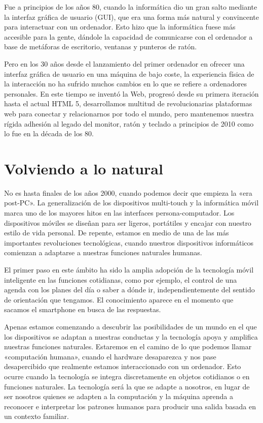 Fue a principios de los años 80, cuando la informática dio un gran salto mediante la interfaz gráfica de usuario (GUI), que era una forma más natural y convincente para interactuar con un ordenador. Esto hizo que la informática fuese más accesible para la gente, dándole la capacidad de comunicarse con el ordenador a base de metáforas de escritorio, ventanas y punteros de ratón.

Pero en los 30 años desde el lanzamiento del primer ordenador en ofrecer una interfaz gráfica de usuario en una máquina de bajo coste, la experiencia física de la interacción no ha sufrido muchos cambios en lo que se refiere a ordenadores personales. En este tiempo se inventó la Web, progresó desde su primera iteración hasta el actual HTML 5, desarrollamos multitud de revolucionarias plataformas web para conectar y relacionarnos por todo el mundo, pero mantenemos nuestra rígida adhesión al legado del monitor, ratón y teclado a principios de 2010 como lo fue en la década de los 80. 

\section{Volviendo a lo natural}
No es hasta finales de los años 2000, cuando podemos decir que empieza la «era post-PC». La generalización de los dispositivos multi-touch y la informática móvil marca uno de los mayores hitos en las interfaces persona-computador. Los dispositivos móviles se diseñan para ser ligeros, portátiles y encajar con nuestro estilo de vida personal. De repente, estamos en medio de una de las más importantes revoluciones tecnológicas, cuando nuestros dispositivos informáticos comienzan a adaptarse a nuestras funciones naturales humanas.

El primer paso en este ámbito ha sido la amplia adopción de la tecnología móvil inteligente en las funciones cotidianas, como por ejemplo, el control de una agenda con los planes del día o saber a dónde ir, independientemente del sentido de orientación que tengamos. El conocimiento aparece en el momento que sacamos el smartphone en busca de las respuestas.

Apenas estamos comenzando a descubrir las posibilidades de un mundo en el que los dispositivos se adaptan a nuestras conductas y la tecnología apoya y amplifica nuestras funciones naturales. Estaremos en el camino de lo que podemos llamar «computación humana», cuando el hardware desaparezca y nos pase desapercibido que realmente estamos interaccionado con un ordenador. Esto ocurre cuando la tecnología se integra discretamente en objetos cotidianos o en funciones naturales. La tecnología será la que se adapte a nosotros, en lugar de ser nosotros quienes se adapten a la computación y la máquina aprenda a reconocer e interpretar los patrones humanos para producir una salida basada en un contexto familiar.


